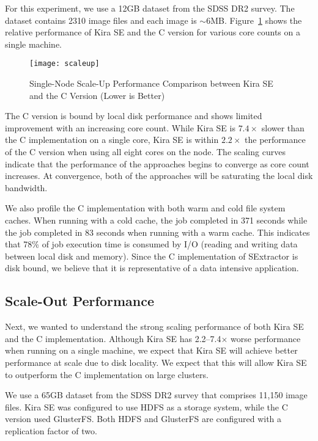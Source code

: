 \documentclass[conference]{IEEEtran}
\begin{document}
For this experiment, we use a 12GB dataset from the SDSS DR2 survey. The dataset contains
2310 image files and each image is $\sim$6MB.
Figure~\ref{fig:scaleup} shows the relative
performance of Kira SE and the C version for various core counts on a single machine.

\begin{figure}[h]
	\begin{center}
		\texttt{[image: scaleup]}
		\caption{Single-Node Scale-Up Performance Comparison between Kira SE and the C Version (Lower is Better)
		\label{fig:scaleup}}
  	\end{center}
\end{figure}

The C version is bound by local disk performance and shows limited improvement with
an increasing core count. While Kira SE is $7.4\times$ slower than the C implementation
on a single core, Kira SE is within $2.2\times$ the performance of the C version when using all eight cores on the node.
The scaling curves indicate that the performance of the approaches begins to converge
as core count increases. At convergence, both of the approaches will be saturating the local
disk bandwidth.

We also profile the C implementation with both warm and cold file system caches. When running with a
cold cache, the job completed in 371 seconds while the job completed in 83 seconds when
running with a warm cache. This indicates that 78\% of job execution time is consumed by
I/O (reading and writing data between local disk and memory). Since the C implementation of
SExtractor is disk bound, we believe that it is representative of a data intensive application. 

\subsection{Scale-Out Performance}
\label{sec:Performance-scaleout}

Next, we wanted to understand the strong scaling performance of both Kira SE and the C
implementation. Although Kira SE has 2.2--7.4$\times$ worse performance when running on
a single machine, we expect that Kira SE will achieve better performance at scale due
to disk locality. We expect that this will allow Kira SE to outperform the C implementation
on large clusters.

We use a 65GB dataset from the SDSS DR2 survey that comprises 11,150 image files.
Kira SE was configured to use HDFS as a storage system, while the C version used GlusterFS. 
Both HDFS and GlusterFS are configured with a replication factor of two.
\end{document}
